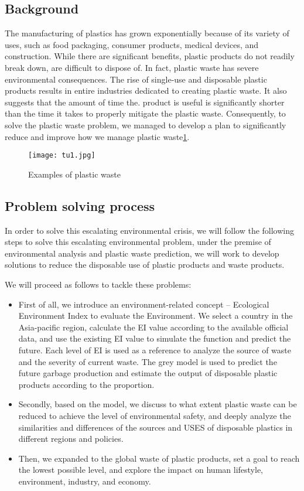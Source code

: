 \documentclass[12pt]{article}
\begin{document}
\subsection{Background}

 The manufacturing of plastics has grown exponentially because of its variety of uses, such as food packaging, consumer products, medical devices, and construction. While there are significant benefits, plastic products do not readily break down, are difficult to dispose of. In fact, plastic waste has severe environmental consequences. The rise of single-use and disposable plastic products results in entire industries dedicated to creating plastic waste. It also suggests that the amount of time the. product is useful is significantly shorter than the time it takes to properly mitigate the plastic waste. Consequently, to solve the plastic waste problem, we managed to develop a plan to significantly reduce and improve how we manage plastic waste\ref{tu1}.%

\begin{figure}[htb]  %
\centering %
\texttt{[image: tu1.jpg]}
\caption{ Examples of plastic waste}\label{tu1}
\end{figure}
\subsection{Problem solving process }
In order to solve this escalating environmental crisis, we will follow the following steps to solve this escalating environmental problem, under the premise of environmental analysis and plastic waste prediction, we will work to develop solutions to reduce the disposable use of plastic products and waste products.

 We will proceed as follows to tackle these problems:
\begin{itemize}
\item First of all, we introduce an environment-related concept -- Ecological Environment Index to evaluate the Environment. We select a country in the Asia-pacific region, calculate the EI value according to the available official data, and use the existing EI value to simulate the function and predict the future. Each level of EI is used as a reference to analyze the source of waste and the severity of current waste. The grey model is used to predict the future garbage production and estimate the output of disposable plastic products according to the proportion.
\item Secondly, based on the model, we discuss to what extent plastic waste can be reduced to achieve the level of environmental safety, and deeply analyze the similarities and differences of the sources and USES of disposable plastics in different regions and policies.
\item Then, we expanded to the global waste of plastic products, set a goal to reach the lowest possible level, and explore the impact on human lifestyle, environment, industry, and economy.
\end{itemize}
\end{document}
